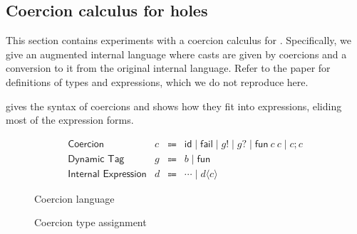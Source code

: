 \documentclass[index.tex]{subfiles}
\begin{document}
\newcommand{\CMName}{\textsf{Coercion}}
\newcommand{\CMV}{\ensuremath{c}}

\newcommand{\CId}{\ensuremath{\textsf{id}}}
\newcommand{\CFail}{\ensuremath{\textsf{fail}}}
\newcommand{\CEmb}[1]{\ensuremath{#1!}}
\newcommand{\CProj}[1]{\ensuremath{#1?}}
\newcommand{\CFun}[2]{\ensuremath{\textsf{fun} ~#1 ~#2}}
\newcommand{\CSeq}[2]{\ensuremath{#1; #2}}

\newcommand{\DTMName}{\textsf{Dynamic Tag}}
\newcommand{\DTMV}{\ensuremath{g}}
\newcommand{\DTBase}{\ensuremath{b}}
\newcommand{\DTFun}{\ensuremath{\textsf{fun}}}

\newcommand{\IEMName}{\textsf{Internal Expression}}
\newcommand{\IEMV}{\ensuremath{d}}
\newcommand{\IECast}[2]{\ensuremath{#1 \langle #2 \rangle}}

\subsection{Coercion calculus for holes}
\label{sec:coercion}
This section contains experiments with a coercion calculus for \Hazelnut{}. Specifically, we give an
augmented internal language where casts are given by coercions and a conversion to it from the original
internal language. Refer to the \HazelnutLive{} paper \cite{omar2019} for definitions of types and
expressions, which we do not reproduce here.

 gives the syntax of coercions and shows how they fit into expressions,
eliding most of the expression forms.

\begin{figure}[htb!]
  \[\begin{array}{rrcl}
    \CMName  & \CMV  & \Coloneqq & \CId \mid \CFail
                                 \mid \CEmb{\DTMV} \mid \CProj{\DTMV} 
                                 \mid \CFun{\CMV}{\CMV} \mid \CSeq{\CMV}{\CMV} \\
    \DTMName & \DTMV & \Coloneqq & \DTBase \mid \DTFun \\
    \IEMName & \IEMV & \Coloneqq & \cdots \mid \IECast{\IEMV}{\CMV}
  \end{array}\]
  \caption{Coercion language}
  \label{fig:coercion-syntax}
\end{figure}

\begin{figure}[htb!]
  \begin{mathpar}
  \end{mathpar}
  \caption{Coercion type assignment}
  \label{fig:coercion-types}
\end{figure}
 
\end{document}
